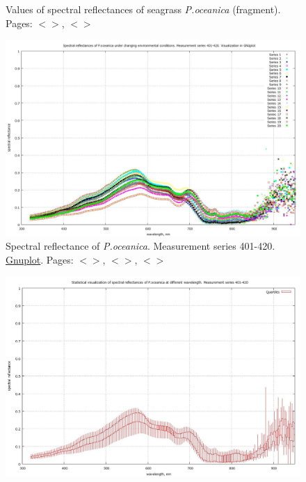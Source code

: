 \documentclass[11pt]{article}
\begin{document}
\begin{appendices}
\begin{figure}[H]
\begin{center}
		\caption{Values of spectral reflectances of seagrass \textit{P.oceanica} (fragment). Pages: $<$\pageref{dataprep}$>$, $<$\pageref{page-40}$>$}
		\label{fig:A.11}
	\end{center}
\end{figure}
\begin{figure}[H]
	\begin{center}
		\includegraphics[scale=0.25]{GNU-401-420.jpg}
		\caption{Spectral reflectance of \textit{P.oceanica}. Measurement series 401-420. \href{http://www.gnuplot.info/}{Gnuplot}. Pages:  $<$\pageref{page-21}$>$, $<$\pageref{dataprep}$>$, $<$\pageref{page-31}$>$}
		\label{fig:A.12}
	\end{center}
\end{figure}
\begin{figure}[H]
	\begin{center}
		\includegraphics[scale=0.25]{GNU-401-420-candles.jpg}

\end{center}
\end{figure}
\end{appendices}
\end{document}
